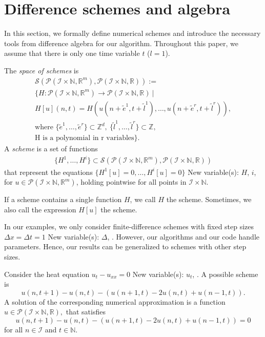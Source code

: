 \documentclass[runningheads]{llncs}
\newcommand{\1}{\chi}
\begin{document}
\section{Difference schemes and algebra}
\label{algodetec}
In this section, we formally define numerical schemes and introduce the necessary tools from difference algebra for our algorithm.
Throughout this paper, we assume that there is only one time variable \(t\) (\(l=1\)).
\begin{definition}
	The \emph{space of schemes} is
	\begin{gather*}
		\mathcal{S}(\mathcal{P}(\mathcal{I}\times\mathbb{N},\mathbb{R}^m),\mathcal{P}(\mathcal{I}\times\mathbb{N},\mathbb{R})):=\\
		\Bigg\{H:\mathcal{P}(\mathcal{I}\times\mathbb{N},\mathbb{R}^m)\rightarrow\mathcal{P}(\mathcal{I}\times\mathbb{N},\mathbb{R})\ \Bigg|\\
		H[u](n,t)=H(u(n+\tilde{e}^1,t+\tilde{l}^1),\ldots,u(n+\tilde{e}^r,t+\tilde{l}^r)),\\
		\text{where }
		\{\tilde{e}^1,\ldots,\tilde{e}^r\}\subset{\mathbb{Z}}^d,\ \{\tilde{l}^1,\ldots,\tilde{l}^r\}\subset{\mathbb{Z}},\\
		\text{H is a polynomial in r variables}
		\Bigg\}.
	\end{gather*}
	A \emph{scheme} is a set of functions
	\begin{gather*}
		\{H^1,\ldots,H^i\}\subset\mathcal{S}(\mathcal{P}(\mathcal{I}\times\mathbb{N},\mathbb{R}^m),\mathcal{P}(\mathcal{I}\times\mathbb{N},\mathbb{R}))
	\end{gather*}
	that represent the equations \(\{H^1[u]=0,\ldots,H^i[u]=0\}\)
{\color{blue} New variable(s): \(H\), \(i\),  }
 for \(u\in\mathcal{P}(\mathcal{I}\times\mathbb{N},\mathbb{R}^m)\), holding pointwise for all points in \(\mathcal{I}\times\mathbb{N}\).
\end{definition}
If a scheme contains a single function \(H\), we call \(H\) the scheme. Sometimes, we also call the expression \(H[u]\) the scheme.
\begin{remark}
	In our examples, we only consider finite-difference schemes with fixed step sizes \(\Delta x=\Delta t=1\)
{\color{blue} New variable(s): \(\Delta\),  }
. However, our algorithms and our code handle parameters. Hence, our results can be generalized to schemes with other step sizes.
\end{remark}
\begin{example}
	\label{ee}
Consider the heat equation	\(u_t-u_{xx}=0\)
{\color{blue} New variable(s): \(u_t\),  }
 \cite{smoller94}.  A possible scheme is
\[	
		u(n,t+1)-u(n,t)-(u(n+1,t)-2u(n,t)+u(n-1,t)).
\]
A solution of the corresponding numerical approximation is a function \(u\in \mathcal{P}(\mathcal{I}\times\mathbb{N},\mathbb{R}),\) that satisfies
\[
		u(n,t+1)-u(n,t)-(u(n+1,t)-2u(n,t)+u(n-1,t))=0
\]
for all \(n\in \mathcal{I}\) and \(t\in \mathbb{N}\). 
\end{example}
\end{document}
